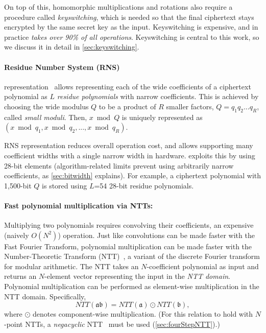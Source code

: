 \tblComputeBreakdown

On top of this, homomorphic multiplications and rotations also require a procedure called \emph{keyswitching},
which is needed so that the final ciphertext
stays encrypted by the same secret key as the input.
Keyswitching is expensive, and in practice \emph{takes over 90\% of all operations}.
Keyswitching is central to this work, so we discuss it in detail in \autoref{sec:keyswitching}.

\paragraph{Residue Number System (RNS)}
representation~\cite{garner:1959:residue}
allows representing each of the wide coefficients of a ciphertext polynomial as $L$ \emph{residue polynomials}
with narrow coefficients. This is achieved by choosing the wide modulus $Q$ to be a product of $R$ smaller factors, $Q = q_1q_2...q_R$, called \emph{small moduli}.
Then, $x \bmod Q$ is uniquely represented as $(x \bmod q_1, x \bmod q_2, ..., x \bmod q_R)$.

RNS representation 
reduces overall operation cost, and allows supporting many coefficient widths with a single narrow width in hardware.
\name exploits this by using 28-bit elements
(algorithm-related limits prevent using arbitrarily narrow coefficients, as \autoref{sec:bitwidth} explains).
For example, a ciphertext polynomial with 1,500-bit $Q$ is stored using $L$=54 28-bit residue polynomials.


\paragraph{Fast polynomial multiplication via NTTs:}
Multiplying two polynomials requires convolving their coefficients, an
expensive (naively $O(N^2)$) operation.
Just like convolutions can be made faster with the Fast Fourier Transform,
polynomial multiplication can be made faster with the Number-Theoretic Transform (NTT)~\cite{moenck1976practical},  %
a variant of the discrete Fourier transform for modular arithmetic.
The NTT takes an $N$\hyp{}coefficient polynomial as input and returns an $N$\hyp{}element vector representing the input in the
\textit{NTT domain}. Polynomial multiplication can be performed as element-wise multiplication in the NTT domain. Specifically,
\begin{equation*}
    NTT(\mathfrak{a}\mathfrak{b}) = NTT(\mathfrak{a}) \odot NTT(\mathfrak{b}),
\end{equation*}
where $\odot$ denotes component-wise multiplication. 
(For this relation to hold with $N$\hyp{}point NTTs, a \emph{negacyclic} NTT~\cite{lyubashevsky:tact10:ideal} must be used (\autoref{sec:fourStepNTT}).)

